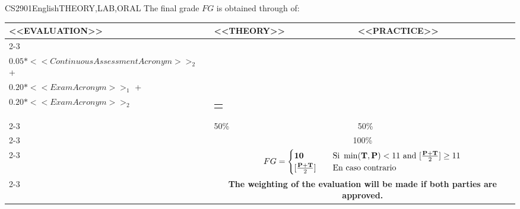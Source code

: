   \begin{evaluation}{CS2901}{English}{THEORY,LAB,ORAL}
  The final grade $FG$ is obtained through of:
 
  \begin{tabularx}{0.9\textwidth}{|X|p{}|p{}|} \hline
    \multirow{4}{*}{\uppercase{<<Evaluation>>}} & \uppercase{<<Theory>>} & \uppercase{<<Practice>>} \\ \cline{2-3}
    & %
        \begin{minipage}{0.95\textwidth}
        \begin{tabular}{l}
            $\text{\textbf{T}} = 0.05*<<ContinuousAssessmentAcronym>>_{1}$  + \\
            $0.05*<<ContinuousAssessmentAcronym>>_{2}$  + \\
            $0.20*<<ExamAcronym>>_{1}$  + \\  
            $0.20*<<ExamAcronym>>_{2}$  
            \end{tabular}
        \end{minipage}
    & %
        \begin{minipage}{0.95\textwidth}
        \begin{tabular}{l}
            $\text{\textbf{P}} =0.2(A + D) + 0.3(Dev) + 0.3(DF)$ 
        \end{tabular}
        \end{minipage}                 \\ \cline{2-3}
  
    & %
    50\% 
    & %
    50\% \\ \cline{2-3}
    & \multicolumn{2}{c|}{100\%}  \\ \cline{2-3}
    & \multicolumn{2}{c|}{
      \begin{math}
        FG =
        \begin{cases}
          \text{\textbf{10}}   & \quad \text{Si } \min(\text{\textbf{T}},\text{\textbf{P}}) < 11 \text{ and }  [\frac{\textbf{P} + \text{\textbf{T}}}{2}] \geq  11\\
          [\frac{\textbf{P} + \text{\textbf{T}}}{2}]    & \quad \text{En caso contrario}
        \end{cases}
      \end{math}
    } \\ \cline{2-3}
    & \multicolumn{2}{c|}{\textbf{The weighting of the evaluation will be made if both parties are approved.}}  \\ \hline
    \end{tabularx}
    

\end{evaluation}
